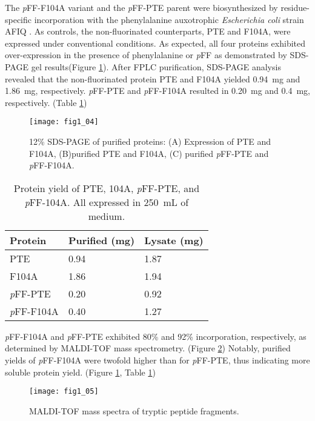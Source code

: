 \begin{refsection}
The \emph{p}FF-F104A variant and the \emph{p}FF-PTE parent were biosynthesized
by residue-specific incorporation with the phenylalanine auxotrophic
\emph{Escherichia coli} strain AFIQ \cite{Yang2014a}. As controls, the
non-fluorinated counterparts, PTE and F104A, were expressed under conventional
conditions. As expected, all four proteins exhibited over-expression in the
presence of phenylalanine or \emph{p}FF as demonstrated by SDS-PAGE gel results(Figure
\ref{fig:sds-gel}). After FPLC purification, SDS-PAGE analysis revealed that
the non-fluorinated protein PTE and F104A yielded \SI{0.94}{\mg} and
\SI{1.86}{\mg}, respectively. \emph{p}FF-PTE and \emph{p}FF-F104A resulted in
\SI{0.20}{\mg} and \SI{0.4}{\mg}, respectively. (Table \ref{tab:protein-yield})
\begin{figure}[h!] \centering \texttt{[image: fig1\_04]}
    \caption[12\% SDS-PAGE of purified proteins: (A) Expression of PTE and
    F104A, (B)purified PTE and F104A, (C) purified \emph{p}FF-PTE and
\emph{p}FF-F104A.]{12\% SDS-PAGE of purified proteins: (A) Expression of PTE
    and F104A, (B)purified PTE and F104A, (C) purified \emph{p}FF-PTE and
    \emph{p}FF-F104A.} 
    \label{fig:sds-gel}
\end{figure}
\begin{table}[h!]
\centering
\begin{tabular}{ lll }
  \hline
  Protein & Purified (mg) & Lysate (mg) \\
  \hline
  PTE & 0.94 & 1.87  \\
  F104A & 1.86 & 1.94  \\
  \emph{p}FF-PTE & 0.20 & 0.92  \\
  \emph{p}FF-F104A & 0.40 & 1.27  \\
  \hline

\end{tabular}
\caption[Protein yield of PTE, 104A, \emph{p}FF-PTE, and \emph{p}FF-104A. All
expressed in \SI{250}{\mL} of medium.]{Protein yield of PTE, 104A,
    \emph{p}FF-PTE, and \emph{p}FF-104A. All expressed in \SI{250}{\mL} of
medium.} 
    \label{tab:protein-yield} 
\end{table}

\emph{p}FF-F104A and \emph{p}FF-PTE exhibited 80\% and 92\%
incorporation, respectively, as determined by MALDI-TOF
mass spectrometry. (Figure \ref{fig:MALDI-fig}) Notably, purified yields of
\emph{p}FF-F104A were twofold higher than for \emph{p}FF-PTE, thus indicating
more soluble protein yield. (Figure \ref{fig:sds-gel}, Table
\ref{tab:protein-yield})
\begin{figure}[h!] \centering \texttt{[image: fig1\_05]}
    \caption[MALDI-TOF mass spectra of tryptic peptide fragments.]{MALDI-TOF
    mass spectra of tryptic peptide fragments.} \label{fig:MALDI-fig} 
\end{figure}


\end{refsection}
